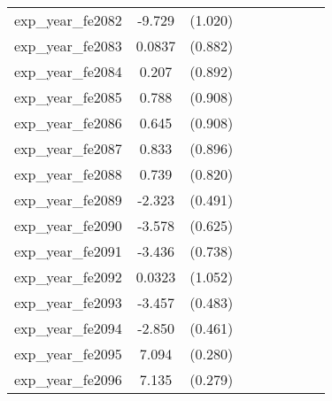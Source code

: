 {\begin{tabular}{l*{4}{cc}}
exp\_year\_fe2082&   -9.729\sym{***}&  (1.020)&                  &         &                  &         &                  &         \\
exp\_year\_fe2083&   0.0837         &  (0.882)&                  &         &                  &         &                  &         \\
exp\_year\_fe2084&    0.207         &  (0.892)&                  &         &                  &         &                  &         \\
exp\_year\_fe2085&    0.788         &  (0.908)&                  &         &                  &         &                  &         \\
exp\_year\_fe2086&    0.645         &  (0.908)&                  &         &                  &         &                  &         \\
exp\_year\_fe2087&    0.833         &  (0.896)&                  &         &                  &         &                  &         \\
exp\_year\_fe2088&    0.739         &  (0.820)&                  &         &                  &         &                  &         \\
exp\_year\_fe2089&   -2.323\sym{***}&  (0.491)&                  &         &                  &         &                  &         \\
exp\_year\_fe2090&   -3.578\sym{***}&  (0.625)&                  &         &                  &         &                  &         \\
exp\_year\_fe2091&   -3.436\sym{***}&  (0.738)&                  &         &                  &         &                  &         \\
exp\_year\_fe2092&   0.0323         &  (1.052)&                  &         &                  &         &                  &         \\
exp\_year\_fe2093&   -3.457\sym{***}&  (0.483)&                  &         &                  &         &                  &         \\
exp\_year\_fe2094&   -2.850\sym{***}&  (0.461)&                  &         &                  &         &                  &         \\
exp\_year\_fe2095&    7.094\sym{***}&  (0.280)&                  &         &                  &         &                  &         \\
exp\_year\_fe2096&    7.135\sym{***}&  (0.279)&                  &         &                  &         &                  &         \\

\end{tabular}}
